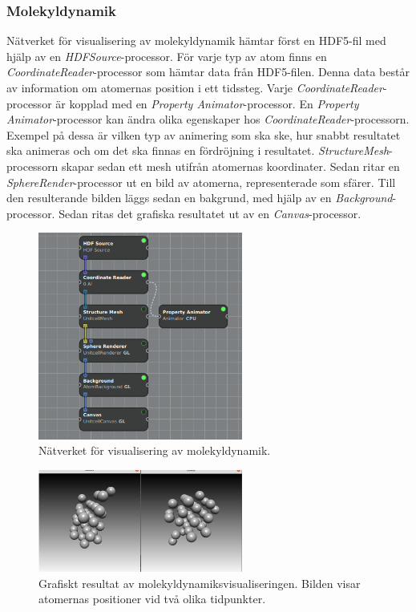\documentclass[10pt,oneside,swedish]{article}
\begin{document}
\subsubsection{Molekyldynamik}\label{Molekyldynamik}
Nätverket för visualisering av molekyldynamik hämtar först en HDF5-fil med hjälp av en \emph{HDFSource}-processor. För varje typ av atom finns en \emph{CoordinateReader}-processor som hämtar data från HDF5-filen. Denna data består av information om atomernas position i ett tidssteg. Varje \emph{CoordinateReader}-processor är kopplad med en \emph{Property Animator}-processor. En \emph{Property Animator}-processor kan ändra olika egenskaper hos \emph{CoordinateReader}-processorn. Exempel på dessa är vilken typ av animering som ska ske, hur snabbt resultatet ska animeras och om det ska finnas en fördröjning i resultatet. \emph{StructureMesh}-processorn skapar sedan ett mesh utifrån atomernas koordinater. Sedan ritar en \emph{SphereRender}-processor ut en bild av atomerna, representerade som sfärer. Till den resulterande bilden läggs sedan en bakgrund, med hjälp av en \emph{Background}-processor. Sedan ritas det grafiska resultatet ut av en \emph{Canvas}-processor.

\begin{figure}[H]
\centering
\includegraphics[width=0.60000\textwidth]{Images/moldyn_network.png}
\caption{Nätverket för visualisering av molekyldynamik.}
\end{figure}

\begin{figure}[H]
\centering
\includegraphics[width=0.60000\textwidth]{Images/moldyn_visualisering.png}
\caption{Grafiskt resultat av molekyldynamiksvisualiseringen. Bilden visar atomernas positioner vid två olika tidpunkter.}
\end{figure}
\end{document}
